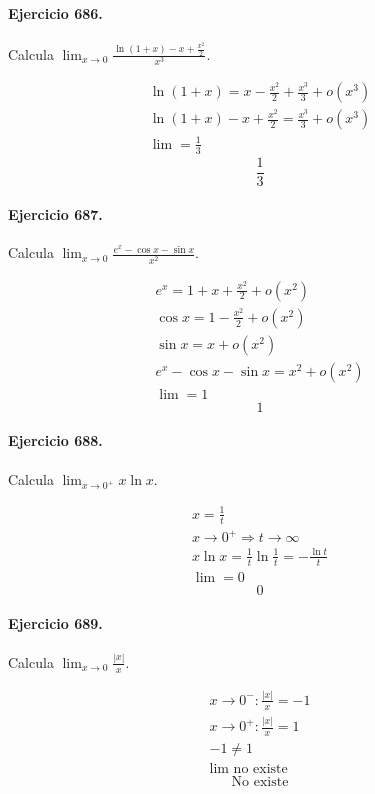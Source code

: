 \documentclass[11pt,a4paper]{article}
\begin{document}
\paragraph{Ejercicio 686.} Calcula $\displaystyle \lim_{x\to0}\frac{\ln(1+x)-x+\frac{x^2}{2}}{x^3}$.

\[
\begin{aligned}
\ln(1+x)=x-\frac{x^2}{2}+\frac{x^3}{3}+o(x^3)\\
\ln(1+x)-x+\frac{x^2}{2}=\frac{x^3}{3}+o(x^3)\\
\lim=\frac13
\end{aligned}
\]
\[\boxed{\frac13}\]


\paragraph{Ejercicio 687.} Calcula $\displaystyle \lim_{x\to0}\frac{e^x-\cos x-\sin x}{x^2}$.

\[
\begin{aligned}
e^x=1+x+\frac{x^2}{2}+o(x^2)\\
\cos x=1-\frac{x^2}{2}+o(x^2)\\
\sin x=x+o(x^2)\\
e^x-\cos x-\sin x=x^2+o(x^2)\\
\lim=1
\end{aligned}
\]
\[\boxed{1}\]


\paragraph{Ejercicio 688.} Calcula $\displaystyle \lim_{x\to0^+}x\ln x$.

\[
\begin{aligned}
x=\frac1t\\
x\to0^+\Rightarrow t\to\infty\\
x\ln x=\frac1t\ln\frac1t=-\frac{\ln t}{t}\\
\lim=0
\end{aligned}
\]
\[\boxed{0}\]


\paragraph{Ejercicio 689.} Calcula $\displaystyle \lim_{x\to0}\frac{|x|}{x}$.

\[
\begin{aligned}
x\to0^-:\frac{|x|}{x}=-1\\
x\to0^+:\frac{|x|}{x}=1\\
-1\ne1\\
\lim\text{{ no existe}}
\end{aligned}
\]
\[\boxed{\text{{No existe}}}\]
\end{document}
